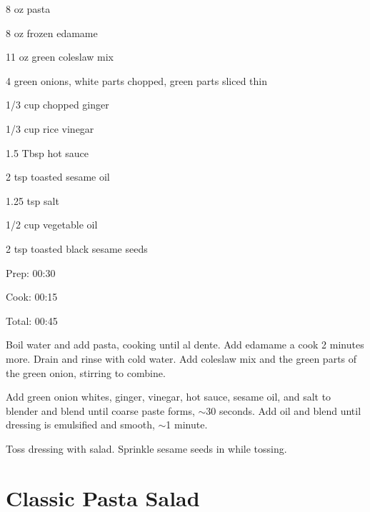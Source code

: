 \documentclass[oneside]{book}  %
\def\thisrecipe{}  %
\newcommand{\recipe}[1]{\section{#1}\def\thisrecipe{: #1}} %
\newcommand{\about}{$\sim$}
\begin{document}
\begin{IT}
  \begin{ingredients}
    \item[8 oz] pasta
    \item[8 oz] frozen edamame
    \item[11 oz] green coleslaw mix
    \item[4] green onions, white parts chopped, green parts sliced thin
    \item[1/3 cup] chopped ginger
    \item[1/3 cup] rice vinegar
    \item[1.5 Tbsp] hot sauce
    \item[2 tsp] toasted sesame oil
    \item[1.25 tsp] salt
    \item[1/2 cup] vegetable oil
    \item[2 tsp] toasted black sesame seeds
  \end{ingredients}

  \switchcolumn

  \begin{timeline}
    \item[Prep:]  00:30
    \item[Cook:]  00:15
    \item[Total:] 00:45
  \end{timeline}
\end{IT}

\begin{directions}
  \item Boil water and add pasta, cooking until al dente. Add edamame a cook 2
  minutes more. Drain and rinse with cold water. Add coleslaw mix and the green
  parts of the green onion, stirring to combine.

  \item Add green onion whites, ginger, vinegar, hot sauce, sesame oil, and salt
  to blender and blend until coarse paste forms, \about 30 seconds. Add oil
  and blend until dressing is emulsified and smooth, \about 1 minute.

  \item Toss dressing with salad. Sprinkle sesame seeds in while tossing.
\end{directions}
\recipe{Classic Pasta Salad} \label{recipe:classic_pasta_salad} %
 
\end{document}
